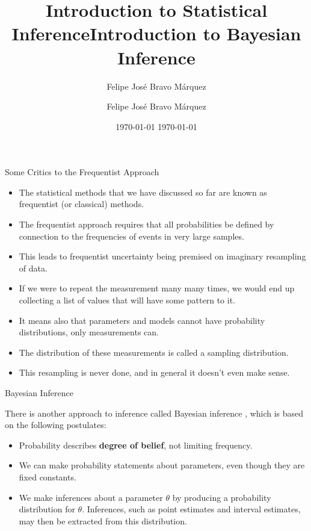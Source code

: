 \documentclass[handout]{beamer}
\title{Introduction to Statistical Inference}
\author[Felipe Bravo Márquez]{\footnotesize
 \textcolor[rgb]{0.00,0.00,1.00}{Felipe José Bravo Márquez}}
\date{ \today }
\title{Introduction to Bayesian Inference}
\author[Felipe Bravo Márquez]{\footnotesize
 \textcolor[rgb]{0.00,0.00,1.00}{Felipe José Bravo Márquez}}
\date{ \today }
\begin{document}
\begin{frame}
\titlepage


\end{frame}




\begin{frame}{Some Critics to the Frequentist Approach}
\scriptsize{
\begin{itemize}
 \item The statistical methods that we have discussed so far are known as frequentist (or classical) methods.
  \item The frequentist approach requires that all probabilities be defined by connection to the frequencies of events in very large samples. 
 \item This leads to frequentist uncertainty being premised on imaginary resampling of data. 
 \item If we were to repeat the measurement many many times, we would end up collecting a list of values that will have some pattern to it. 
 \item  It means also that parameters and models cannot have probability distributions, only measurements can.
 \item The distribution of these measurements is called a sampling distribution. 
 \item This resampling is never done, and in general it doesn't even make sense.
\end{itemize}

} 
\end{frame}

\begin{frame}{Bayesian Inference}
\scriptsize{
There is another approach to inference called Bayesian inference \cite{wasserman2013all}, which is based on the following postulates:
\begin{itemize}
 \item Probability describes \textbf{degree of belief}, not limiting frequency. 
 
 
 \item We can make probability statements about parameters, even though they are fixed constants.
 \item We make inferences about a parameter $\theta$ by producing a probability distribution for $\theta$. Inferences, such as point estimates and interval estimates, may then be extracted from this distribution.
\end{itemize}

} 
\end{frame}
\end{document}
